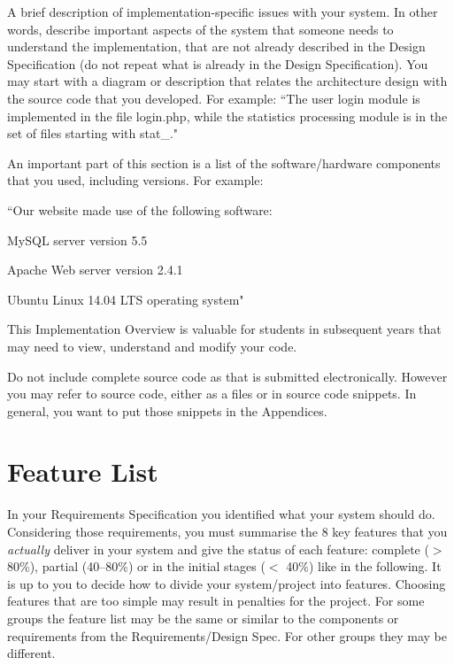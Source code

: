 \documentclass[12pt, a4paper]{report}
\begin{document}
A brief description of implementation-specific issues with your system. In other words, describe important aspects of the system that someone needs to understand the implementation, that are not already described in the Design Specification (do not repeat what is already in the Design Specification). You may start with a diagram or description that relates the architecture design with the source code that you developed. For example: ``The user login module is implemented in the file login.php, while the statistics processing module is in the set of files starting with stat\_."

An important part of this section is a list of the software/hardware components that you used, including versions. For example:

``Our website made use of the following software:

MySQL server version 5.5

Apache Web server version 2.4.1

Ubuntu Linux 14.04 LTS operating system"

This Implementation Overview is valuable for students in subsequent years that may need to view, understand and modify your code.

Do not include complete source code as that is submitted electronically. However you may refer to source code, either as a files or in source code snippets. In general, you want to put those snippets in the Appendices.

\section{Feature List}

In your Requirements Specification you identified what your system should do. Considering those requirements, you must summarise the 8 key features that you \textit{actually} deliver in your system and give the status of each feature: complete ($>$ 80\%), partial (40–80\%) or in the initial stages ($<$ 40\%) like in the following. It is up to you to decide how to divide your system/project into features. Choosing features that are too simple may result in penalties for the project. For some groups the feature list may be the same or similar to the components or requirements from the Requirements/Design Spec. For other groups they may be different.
\end{document}
